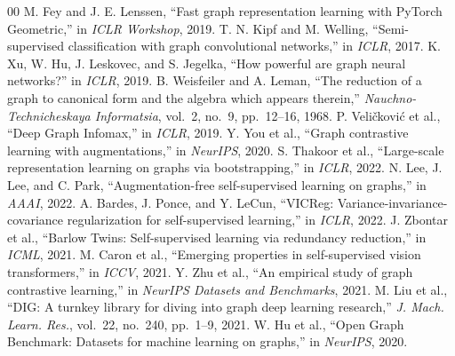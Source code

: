 \documentclass[conference]{IEEEtran}
\begin{document}
\begin{thebibliography}{00}
 M. Fey and J. E. Lenssen, ``Fast graph representation learning with PyTorch Geometric,'' in \textit{ICLR Workshop}, 2019.
 T. N. Kipf and M. Welling, ``Semi-supervised classification with graph convolutional networks,'' in \textit{ICLR}, 2017.
 K. Xu, W. Hu, J. Leskovec, and S. Jegelka, ``How powerful are graph neural networks?'' in \textit{ICLR}, 2019.
 B. Weisfeiler and A. Leman, ``The reduction of a graph to canonical form and the algebra which appears therein,'' \textit{Nauchno-Technicheskaya Informatsia}, vol.~2, no.~9, pp.~12--16, 1968.
 P. Veličković et al., ``Deep Graph Infomax,'' in \textit{ICLR}, 2019.
 Y. You et al., ``Graph contrastive learning with augmentations,'' in \textit{NeurIPS}, 2020.
 S. Thakoor et al., ``Large-scale representation learning on graphs via bootstrapping,'' in \textit{ICLR}, 2022.
 N. Lee, J. Lee, and C. Park, ``Augmentation-free self-supervised learning on graphs,'' in \textit{AAAI}, 2022.
 A. Bardes, J. Ponce, and Y. LeCun, ``VICReg: Variance-invariance-covariance regularization for self-supervised learning,'' in \textit{ICLR}, 2022.
 J. Zbontar et al., ``Barlow Twins: Self-supervised learning via redundancy reduction,'' in \textit{ICML}, 2021.
 M. Caron et al., ``Emerging properties in self-supervised vision transformers,'' in \textit{ICCV}, 2021.
 Y. Zhu et al., ``An empirical study of graph contrastive learning,'' in \textit{NeurIPS Datasets and Benchmarks}, 2021.
 M. Liu et al., ``DIG: A turnkey library for diving into graph deep learning research,'' \textit{J. Mach. Learn. Res.}, vol.~22, no.~240, pp.~1--9, 2021.
 W. Hu et al., ``Open Graph Benchmark: Datasets for machine learning on graphs,'' in \textit{NeurIPS}, 2020.
\end{thebibliography}
\end{document}
